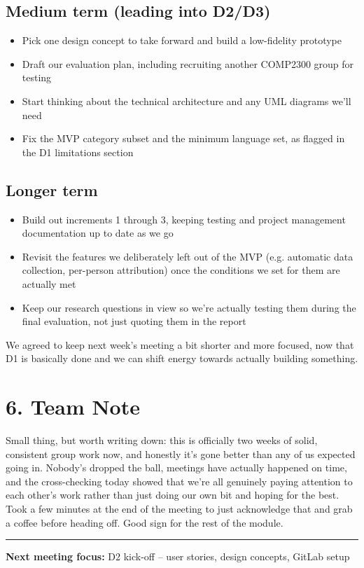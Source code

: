 \documentclass[11pt,a4paper]{article}
\begin{document}
\subsection*{Medium term (leading into D2/D3)}
\begin{itemize}
    \item Pick one design concept to take forward and build a low-fidelity prototype
    \item Draft our evaluation plan, including recruiting another COMP2300 group for testing
    \item Start thinking about the technical architecture and any UML diagrams we'll need
    \item Fix the MVP category subset and the minimum language set, as flagged in the D1 limitations section
\end{itemize}

\subsection*{Longer term}
\begin{itemize}
    \item Build out increments 1 through 3, keeping testing and project management documentation up to date as we go
    \item Revisit the features we deliberately left out of the MVP (e.g. automatic data collection, per-person attribution) once the conditions we set for them are actually met
    \item Keep our research questions in view so we're actually testing them during the final evaluation, not just quoting them in the report
\end{itemize}

We agreed to keep next week's meeting a bit shorter and more focused, now that D1 is basically done and we can shift energy towards actually building something.

\vspace{10pt}
\section*{6. Team Note}

Small thing, but worth writing down: this is officially two weeks of solid, consistent group work now, and honestly it's gone better than any of us expected going in. Nobody's dropped the ball, meetings have actually happened on time, and the cross-checking today showed that we're all genuinely paying attention to each other's work rather than just doing our own bit and hoping for the best. Took a few minutes at the end of the meeting to just acknowledge that and grab a coffee before heading off. Good sign for the rest of the module.

\vspace{14pt}
\hrule
\vspace{8pt}

\textbf{Next meeting focus:} D2 kick-off -- user stories, design concepts, GitLab setup
\end{document}
